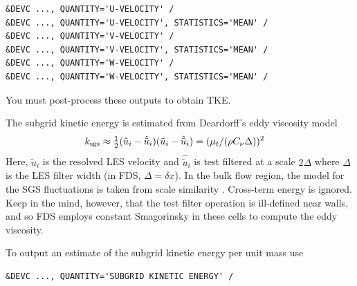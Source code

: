 \documentclass[11pt]{book}
\begin{document}
\begin{lstlisting}
&DEVC ..., QUANTITY='U-VELOCITY' /
&DEVC ..., QUANTITY='U-VELOCITY', STATISTICS='MEAN' /
&DEVC ..., QUANTITY='V-VELOCITY' /
&DEVC ..., QUANTITY='V-VELOCITY', STATISTICS='MEAN' /
&DEVC ..., QUANTITY='W-VELOCITY' /
&DEVC ..., QUANTITY='W-VELOCITY', STATISTICS='MEAN' /
\end{lstlisting}
You must post-process these outputs to obtain TKE.

The subgrid kinetic energy is estimated from Deardorff's eddy viscosity model
\begin{align}
k_{\rm sgs} &\approx \mbox{$\frac{1}{2}$}(\tilde{u}_i - \hat{\tilde{u}}_i)(\tilde{u}_i - \hat{\tilde{u}}_i) = ( \mu_t/(\rho C_\nu \Delta) )^2
\end{align}
Here, $\tilde{u}_i$ is the resolved LES velocity and $\hat{\tilde{u}}_i$ is test filtered at a scale $2\Delta$ where $\Delta$ is the LES filter width (in FDS, $\Delta=\delta x$).  In the bulk flow region, the model for the SGS fluctuations is taken from scale similarity \cite{Bardina:1980}.  Cross-term energy is ignored.  Keep in the mind, however, that the test filter operation is ill-defined near walls, and so FDS employs constant Smagorinsky in these cells to compute the eddy viscosity.

To output an estimate of the subgrid kinetic energy per unit mass use
\begin{lstlisting}
&DEVC ..., QUANTITY='SUBGRID KINETIC ENERGY' /
\end{lstlisting}
\end{document}
